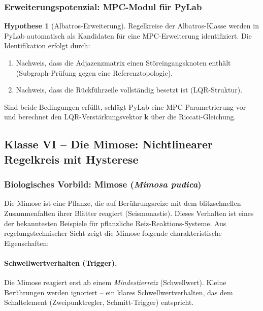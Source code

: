 \documentclass[a4paper,12pt]{article}
\theoremstyle{definition}
\newtheorem{hypothese}{Hypothese}
\begin{document}
\subsubsection{Erweiterungspotenzial: MPC-Modul für PyLab}

\begin{hypothese}[Albatros-Erweiterung]
	Regelkreise der Albatros-Klasse werden in PyLab automatisch als Kandidaten
	für eine MPC-Erweiterung identifiziert. Die Identifikation erfolgt durch:
	\begin{enumerate}
		\item Nachweis, dass die Adjazenzmatrix einen Störeingangsknoten enthält
		(Subgraph-Prüfung gegen eine Referenztopologie).
		\item Nachweis, dass die Rückführzeile vollständig besetzt ist (LQR-Struktur).
	\end{enumerate}
	Sind beide Bedingungen erfüllt, schlägt PyLab eine MPC-Parametrierung vor
	und berechnet den LQR-Verstärkungsvektor $\mathbf{k}$ über die
	Riccati-Gleichung.
\end{hypothese}

\subsection{Klasse VI -- Die Mimose: Nichtlinearer Regelkreis mit Hysterese}
\label{subsec:klasse_mimose}

\subsubsection{Biologisches Vorbild: Mimose (\textit{Mimosa pudica})}

Die Mimose ist eine Pflanze, die auf Berührungsreize mit dem blitzschnellen
Zusammenfalten ihrer Blätter reagiert (Seismonastie). Dieses Verhalten ist
eines der bekanntesten Beispiele für pflanzliche Reiz-Reaktions-Systeme.
Aus regelungstechnischer Sicht zeigt die Mimose folgende charakteristische
Eigenschaften:

\paragraph{Schwellwertverhalten (Trigger).}
Die Mimose reagiert erst ab einem \emph{Mindestierreiz} (Schwellwert). Kleine
Berührungen werden ignoriert -- ein klares Schwellwertverhalten, das dem
Schaltelement (Zweipunktregler, Schmitt-Trigger) entspricht.
\end{document}
